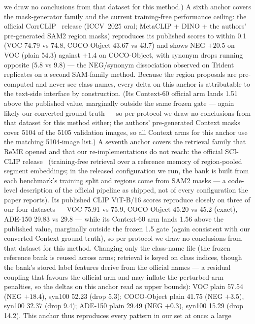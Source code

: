 \documentclass[11pt]{article}
\begin{document}
we draw no conclusions from that dataset for this method.)
A sixth anchor covers the mask-generator family and the current
training-free performance ceiling: the official CorrCLIP~\cite{zhang2025corrclip}
release (ICCV~2025 oral; MetaCLIP \citep{xu2024metaclip} + DINO + the authors'
pre-generated SAM2 \citep{ravi2024sam2} region masks) reproduces its published scores to within 0.1 (VOC 74.79 vs
74.8, COCO-Object 43.67 vs 43.7) and shows NEG $+20.5$ on VOC (plain 54.3) against $+1.4$ on
COCO-Object, with synonym drops running opposite (5.8 vs 9.8) --- the
NEG/synonym dissociation observed on Trident replicates on a second
SAM-family method. Because the region proposals are pre-computed and never
see class names, every delta on this anchor is attributable to the
text-side interface by construction. (Its Context-60 official arm lands
1.51 above the published value, marginally outside the same frozen gate
--- again likely our converted ground truth --- so per protocol we draw no
conclusions from that dataset for this method either; the authors'
pre-generated Context masks cover 5104 of the 5105 validation images, so
all Context arms for this anchor use the matching 5104-image list.)
A seventh anchor covers the retrieval family that ReME opened and that
our re-implementations do not reach: the official SCI-CLIP
release~\cite{zamini2026sciclip} (training-free retrieval over a
reference memory of region-pooled segment embeddings; in the released
configuration we run, the bank is built from each benchmark's training
split and regions come from SAM2 masks --- a code-level description of
the official pipeline as shipped, not of every configuration the paper
reports). Its published CLIP ViT-B/16
scores reproduce closely on three of our four datasets --- VOC 75.91 vs
75.9, COCO-Object 45.20 vs 45.2 (exact), ADE-150 29.83 vs 29.8 --- while
its Context-60 arm lands 1.56 above the published value, marginally
outside the frozen 1.5 gate (again consistent with our converted
Context ground truth), so per protocol we draw no conclusions from that
dataset for this method. Changing only the class-name file (the frozen
reference bank is reused across arms; retrieval is keyed on class
indices, though the bank's stored label features derive from the
official names --- a residual coupling that favours the official arm
and may inflate the perturbed-arm penalties, so the deltas on this
anchor read as upper bounds): VOC plain 57.54 (NEG $+18.4$), syn100 52.23 (drop 5.3);
COCO-Object plain 41.75 (NEG $+3.5$), syn100 32.37 (drop 9.4); ADE-150
plain 29.49 (NEG $+0.3$), syn100 15.29 (drop 14.2). This anchor thus reproduces every pattern in our set at once: a large
\end{document}
